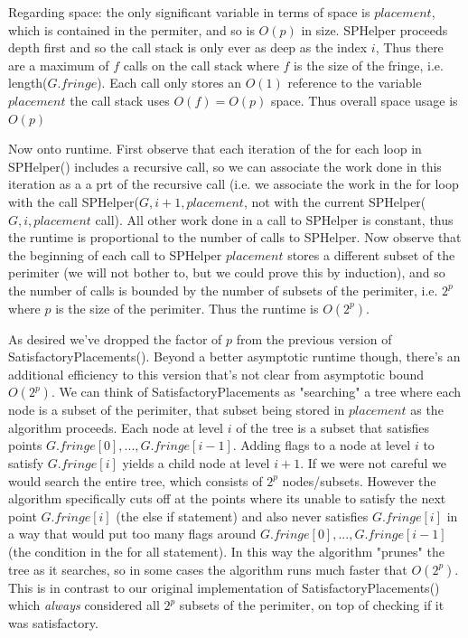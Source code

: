 \documentclass{article}
\theoremstyle{definition}
\theoremstyle{definition}
\theoremstyle{theorem}
\begin{document}
	Regarding space: the only significant variable in terms of space is $placement$, which is contained in the permiter, and so is $O(p)$ in size. SPHelper proceeds depth first and so the call stack is only ever as deep as the index $i$, Thus there are a maximum of $f$  calls on the call stack where $f$ is the size of the fringe, i.e. length($G.fringe$). Each call only stores an $O(1)$ reference to the variable $placement$ the call stack uses $O(f) = O(p)$ space. Thus overall space usage is $O(p)$
	
	Now onto runtime. First observe that each iteration of the for each loop in SPHelper() includes a recursive call, so we can associate the work done in this iteration as a a prt of the recursive call (i.e. we associate the work in the for loop with the call SPHelper($G, i+1, placement$, not with the current SPHelper($G, i, placement$ call). All other work done in a call to SPHelper is constant, thus the runtime is proportional to the number of calls to SPHelper. Now observe that the beginning of each call to SPHelper $placement$ stores a different subset of the perimiter (we will not bother to, but we could prove this by induction), and so the number of calls is bounded by the number of subsets of the perimiter, i.e. $2^p$ where $p$ is the size of the perimiter. Thus the runtime is $O(2^p)$.
	
	As desired we've dropped the factor of $p$ from the previous version of SatisfactoryPlacements(). Beyond a better asymptotic runtime though, there's an additional efficiency to this version that's not clear from asymptotic bound $O(2^p)$.  We can think of SatisfactoryPlacements as "searching" a tree where each node is a subset of the perimiter, that subset being stored in $placement$ as the algorithm proceeds. Each node at level $i$ of the tree is a subset that satisfies points $G.fringe[0],...,G.fringe[i-1]$. Adding flags to a node at level $i$ to satisfy $G.fringe[i]$ yields a child node at level $i + 1$. If we were not careful we would search the entire tree, which consists of $2^p$ nodes/subsets. However the algorithm specifically cuts off at the points where its unable to satisfy the next point $G.fringe[i]$ (the else if statement) and also never satisfies $G.fringe[i]$ in a way that would put too many flags around $G.fringe[0],...,G.fringe[i-1]$ (the condition in the for all statement). In this way the algorithm "prunes" the tree as it searches, so in some cases the algorithm runs much faster that $O(2^p)$. This is in contrast to our original implementation of SatisfactoryPlacements() which \textit{always} considered all $2^p$ subsets of the perimiter, on top of checking if it was satisfactory.
	
	
	
	
	
\end{document}
